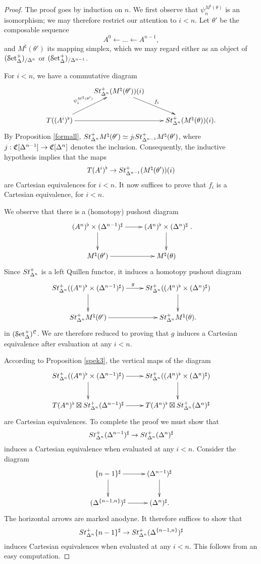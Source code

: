 \begin{proof}
The proof goes by induction on $n$. We first observe that $\psi^{M^{\natural}(\theta)}_{n}$
is an isomorphism; we may therefore restrict our attention to $i < n$. 
Let $\theta'$ be the composable sequence
$$ A^0 \leftarrow \ldots \leftarrow A^{n-1},$$
and $M^{\natural}(\theta')$ its mapping simplex, which we may regard either as an object
of $(\operatorname{\mathcal{S}et_{\Delta}^{+}})_{/\Delta^n}$ or $(\operatorname{\mathcal{S}et_{\Delta}^{+}})_{/\Delta^{n-1}}$.

For $i < n$, we have a commutative diagram
$$ \xymatrix{ & \St^{+}_{\Delta^n}(M^{\natural}(\theta'))(i) \ar[dr]^{f_{i}} & \\
T((A^i)^{\flat}) \ar[ur]^{ \psi^{M^{\natural}(\theta')}_i} \ar[rr]
 & & \St^{+}_{\Delta^n}(M^{\natural}(\theta))(i).}$$
By Proposition \ref{formall}, $St^{+}_{\Delta^n} M^{\natural}(\theta') \simeq j_! St^{+}_{\Delta^{n-1}} M^{\natural}(\theta')$, where $j: \operatorname{\mathfrak{C}}[\Delta^{n-1}] \rightarrow \operatorname{\mathfrak{C}}[\Delta^n]$ denotes the inclusion. Consequently, the inductive hypothesis implies that the maps
$$ T(A^i)^{\flat} \rightarrow St^{+}_{\Delta^{n-1}}(M^{\natural}(\theta'))(i) $$ are Cartesian equivalences for $i < n$. It now suffices to prove that $f_i$ is a Cartesian equivalence, for $i < n$.

We observe that there is a (homotopy) pushout diagram
$$ \xymatrix{ (A^n)^{\flat} \times (\Delta^{n-1})^{\sharp} \ar[r] \ar[d] & (A^n)^{\flat} \times (\Delta^n)^{\sharp} \ar[d] \\
M^\natural(\theta') \ar[r] & M^\natural(\theta) }.$$
Since $St^{+}_{\Delta^n}$ is a left Quillen functor, it induces a homotopy pushout diagram
$$ \xymatrix{ \St^{+}_{\Delta^n} ( (A^n)^{\flat} \times (\Delta^{n-1})^\sharp) \ar[r]^{g} \ar[d] &
\St^{+}_{\Delta^n} ( (A^n)^{\flat} \times (\Delta^n)^{\sharp} ) \ar[d] \\
\St^{+}_{\Delta^n} M^{\natural}(\theta') \ar[r] & \St^{+}_{\Delta^n} M^\natural(\theta).}$$
in $(\operatorname{\mathcal{S}et_{\Delta}^{+}})^{\operatorname{\mathcal{C}}}$. We are therefore reduced to proving that $g$ induces a Cartesian equivalence 
after evaluation at any $i < n$.

According to Proposition \ref{spek3}, the vertical maps of the diagram
$$ \xymatrix{ 
\St^{+}_{\Delta^n} ((A^n)^{\flat} \times (\Delta^{n-1})^{\sharp}) \ar[r] \ar[d] & \St^{+}_{\Delta^n} ((A^n)^{\flat} \times (\Delta^n)^{\sharp}) \ar[d] \\ T(A^n)^{\flat} \boxtimes
\St^{+}_{\Delta^n} (\Delta^{n-1})^{\sharp} \ar[r] & T(A^n)^{\flat} \boxtimes \St^{+}_{\Delta^n} (\Delta^n)^{\sharp}}$$
are Cartesian equivalences. To complete the proof we must show that
$$St^{+}_{\Delta^n}( \Delta^{n-1})^{\sharp} \rightarrow St^{+}_{\Delta^n}( \Delta^n )^{\sharp}$$ induces a Cartesian equivalence when evaluated at any $i < n$. Consider the diagram
$$ \xymatrix{ \{ n-1 \}^{\sharp} \ar[r] \ar[d] & ( \Delta^{n-1} )^{\sharp} \ar[d] \\
 ( \Delta^{ \{n-1,n\}} )^{\sharp} \ar[r] & (\Delta^n)^{\sharp}.}$$
The horizontal arrows are marked anodyne. It therefore suffices to show that
$$St^{+}_{\Delta^n} \{n-1\}^{\sharp} \rightarrow St^{+}_{\Delta^n} (\Delta^{ \{n-1,n\} })^{\sharp}$$
induces Cartesian equivalences when evaluated at any $i < n$. This follows from an easy computation.
\end{proof}

